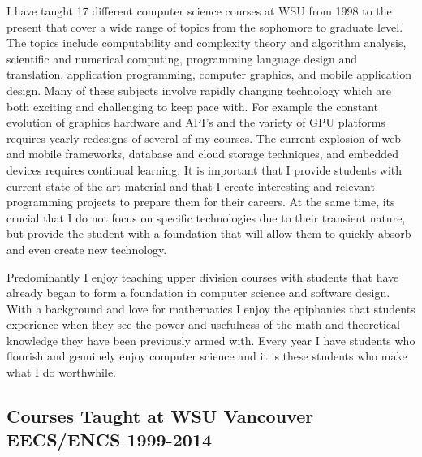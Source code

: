 \documentclass[10pt]{article}
\begin{document}
I have taught 17 different computer science courses at WSU from 1998 to the present that cover a wide
range of topics from the sophomore to graduate level. The topics include computability and complexity
theory and algorithm analysis, scientific and numerical computing,  programming language design
and translation, application programming, computer graphics, and mobile application design.
Many of these subjects involve rapidly changing technology which are both exciting and challenging
to keep pace with. For example the constant evolution of graphics hardware and API's and the
variety of GPU platforms requires yearly redesigns of several of my courses. The current 
explosion of web and mobile frameworks, database and cloud storage techniques, and embedded
devices requires continual learning. It is important that I provide students with current 
state-of-the-art material and that I create interesting and relevant programming projects to prepare
them for their careers. At the same time, its crucial that I do not focus on specific technologies
due to their transient nature, but provide the student with a foundation that will allow
them to quickly absorb and even create new technology. 

Predominantly I enjoy teaching upper division courses with students that have already began
to form a foundation in computer science and software design. With a background and love
for mathematics I enjoy the epiphanies that students experience when they see the power
and usefulness of the math and theoretical knowledge they have been previously armed with.
Every year I have students who flourish and genuinely enjoy computer science and it is
these students who make what I do worthwhile.
  
\subsection*{Courses Taught at WSU Vancouver EECS/ENCS 1999-2014}
\end{document}

